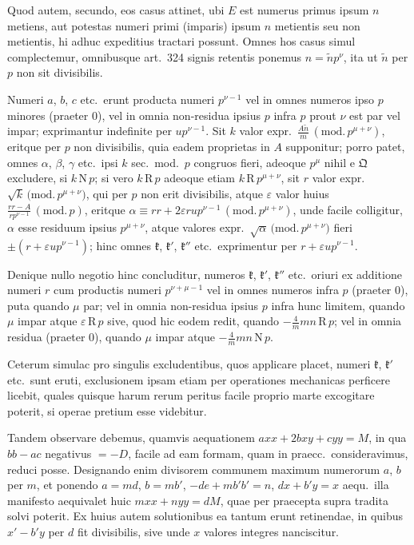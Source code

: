 \documentclass[12pt,a4paper]{article}
\theoremstyle{plain}
\theoremstyle{definition}
\theoremstyle{remark}
\newcommand{\RM}{\mathrm{R}}
\newcommand{\NR}{\mathrm{N}}
\newcommand{\Q}{\mathfrak{Q}}
\begin{document}
Quod autem, secundo, eos casus attinet, ubi $E$ est numerus primus ipsum $n$ metiens, aut potestas numeri primi (imparis) ipsum $n$ metientis seu non metientis, hi adhuc expeditius tractari possunt. Omnes hos casus simul complectemur, omnibusque art.\ 324 signis retentis ponemus $n=\tilde{n}p^\nu$, ita ut $\tilde{n}$ per $p$ non sit divisibilis.

Numeri $a$, $b$, $c$ etc.\ erunt producta numeri $p^{\nu-1}$ vel in omnes numeros ipso $p$ minores (praeter $0$), vel in omnia non-residua ipsius $p$ infra $p$ prout $\nu$ est par vel impar; exprimantur indefinite per $up^{\nu-1}$. Sit $k$ valor expr.~$\frac{A\tilde{n}}{m}\,(\mathrm{mod.}\,p^{\mu+\nu})$, eritque per $p$ non divisibilis, quia eadem proprietas in $A$ supponitur; porro patet, omnes $\alpha$, $\beta$, $\gamma$ etc.\ ipsi $k$ sec.\ mod.\ $p$ congruos fieri, adeoque $p^\mu$ nihil e $\Q$ excludere, si $k\,\NR\,p$; si vero $k\,\RM\,p$ adeoque etiam $k\,\RM\,p^{\mu+\nu}$, sit $r$ valor expr.~$\surd k\,\mathrm{(mod.}\,p^{\mu+\nu})$, qui per $p$ non erit divisibilis, atque $\varepsilon$ valor huius $\frac{rr-A}{rp^{\nu-1}}\,(\mathrm{mod.}\,p)$, eritque $\alpha\equiv rr+2\varepsilon rup^{\nu-1}\,(\mathrm{mod.}\,p^{\mu+\nu})$, unde facile colligitur, $\alpha$ esse residuum ipsius $p^{\mu+\nu}$, atque valores expr.~$\surd\alpha\,\mathrm{(mod.}\,p^{\mu+\nu})$ fieri $\pm(r+\varepsilon up^{\nu-1})$; hinc omnes $\mathfrak{k}$, $\mathfrak{k}'$, $\mathfrak{k}''$ etc.\ exprimentur per $r+\varepsilon up^{\nu-1}$.

Denique nullo negotio hinc concluditur, numeros $\mathfrak{k}$, $\mathfrak{k}'$, $\mathfrak{k}''$ etc.\ oriuri ex additione numeri $r$ cum productis numeri $p^{\nu+\mu-1}$ vel in omnes numeros infra $p$ (praeter $0$), puta quando $\mu$ par; vel in omnia non-residua ipsius $p$ infra hunc limitem, quando $\mu$ impar atque $\varepsilon\,\RM\,p$ sive, quod hic eodem redit, quando $-\frac{4}{m}mn\,\RM\,p$; vel in omnia residua (praeter $0$), quando $\mu$ impar atque $-\frac{4}{m}mn\,\NR\,p$.

Ceterum simulac pro singulis excludentibus, quos applicare placet, numeri $\mathfrak{k}$, $\mathfrak{k}'$ etc.\ sunt eruti, exclusionem ipsam etiam per operationes mechanicas perficere licebit, quales quisque harum rerum peritus facile proprio marte excogitare poterit, si operae pretium esse videbitur.

Tandem observare debemus, quamvis aequationem $axx+2bxy+cyy=M$, in qua $bb-ac$ negativus $=-D$, facile ad eam formam, quam in praecc.\ consideravimus, reduci posse. Designando enim divisorem communem maximum numerorum $a$, $b$ per $m$, et ponendo $a=md$, $b=mb'$, $-de+mb'b'=n$, $dx+b'y=x$ aequ.\ illa manifesto aequivalet huic $mxx+nyy=dM$, quae per praecepta supra tradita solvi poterit. Ex huius autem solutionibus ea tantum erunt retinendae, in quibus $x'-b'y$ per $d$ fit divisibilis, sive unde $x$ valores integres nanciscitur.
\end{document}
